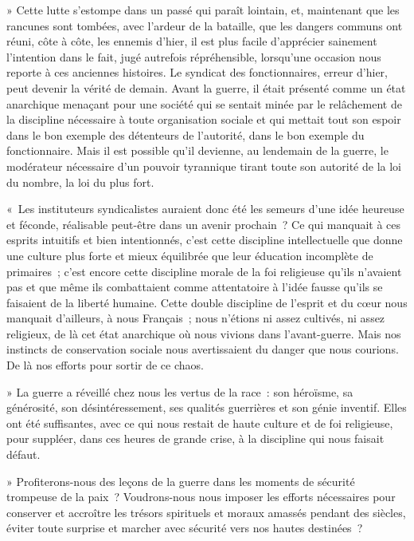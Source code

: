\documentclass[french,twoside]{book} %
\begin{document}
{ » Cette lutte s’estompe dans un passé qui paraît lointain, et, maintenant que les rancunes sont tombées, avec l’ardeur de la bataille, que les dangers communs ont réuni, côte à côte, les ennemis d’hier, il est plus facile d’apprécier sainement l’intention dans le fait, jugé autrefois répréhensible, lorsqu’une occasion nous reporte à ces anciennes histoires. Le syndicat des fonctionnaires, erreur d’hier, peut devenir la vérité de demain. Avant la guerre, il était présenté comme un état anarchique menaçant pour une société qui se sentait minée par le relâchement de la discipline nécessaire à toute organisation sociale et qui mettait tout son espoir dans le bon exemple des détenteurs de l’autorité, dans le bon exemple du fonctionnaire. Mais il est possible qu’il devienne, au lendemain de la guerre, le modérateur nécessaire d’un pouvoir tyrannique tirant toute son autorité de la loi du nombre, la loi du plus fort.‌\par
 « Les instituteurs syndicalistes auraient donc été les semeurs d’une idée heureuse et féconde, réalisable peut-être dans un avenir prochain ? Ce qui manquait à ces esprits intuitifs et bien intentionnés, c’est cette discipline intellectuelle que donne une culture plus forte et mieux équilibrée que leur éducation incomplète de primaires ; c’est encore cette discipline morale de la foi religieuse qu’ils n’avaient pas et que même ils combattaient comme attentatoire à l’idée fausse qu’ils se faisaient de la liberté humaine. Cette double discipline de l’esprit et du cœur nous manquait d’ailleurs, à nous Français ; nous n’étions ni assez cultivés, ni assez religieux, de là cet état anarchique où nous vivions dans l’avant-guerre. Mais nos instincts de conservation sociale nous avertissaient du danger que nous courions. De là nos efforts pour sortir de ce chaos.‌\par
 » La guerre a réveillé chez nous les vertus de la race : son héroïsme, sa générosité, son désintéressement, ses qualités guerrières et son génie inventif. Elles ont été suffisantes, avec ce qui nous restait de haute culture et de foi religieuse, pour suppléer, dans ces heures de grande crise, à la discipline qui nous faisait défaut.‌\par
 » Profiterons-nous des leçons de la guerre dans les moments de sécurité trompeuse de la paix ? Voudrons-nous nous imposer les efforts nécessaires pour conserver et accroître les trésors spirituels et moraux amassés pendant des siècles, éviter toute surprise et marcher avec sécurité vers nos hautes destinées ?‌\par
}
\end{document}
